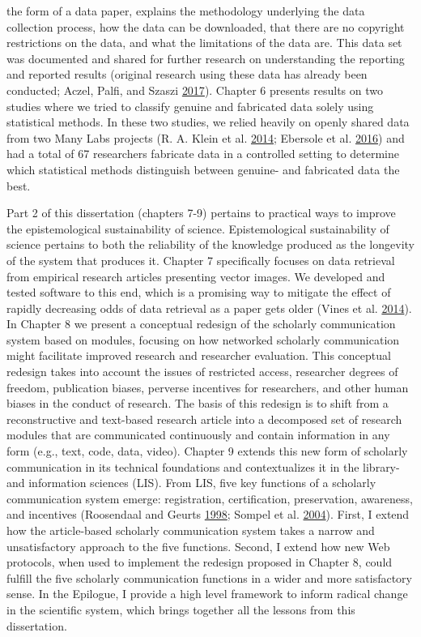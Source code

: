 \documentclass[a5paper]{book}
\begin{document}
the form of a data paper, explains the methodology underlying the data
collection process, how the data can be downloaded, that there are no
copyright restrictions on the data, and what the limitations of the data
are. This data set was documented and shared for further research on
understanding the reporting and reported results (original research
using these data has already been conducted; Aczel, Palfi, and Szaszi
\protect\hyperlink{ref-doi:10.1371ux2fjournal.pone.0182651}{2017}).
Chapter 6 presents results on two studies where we tried to classify
genuine and fabricated data solely using statistical methods. In these
two studies, we relied heavily on openly shared data from two Many Labs
projects (R. A. Klein et al.
\protect\hyperlink{ref-doi:10.1027ux2f1864-9335ux2fa000178}{2014};
Ebersole et al.
\protect\hyperlink{ref-doi:10.1016ux2fj.jesp.2015.10.012}{2016}) and had
a total of 67 researchers fabricate data in a controlled setting to
determine which statistical methods distinguish between genuine- and
fabricated data the best.

Part 2 of this dissertation (chapters 7-9) pertains to practical ways to
improve the epistemological sustainability of science. Epistemological
sustainability of science pertains to both the reliability of the
knowledge produced as the longevity of the system that produces it.
Chapter 7 specifically focuses on data retrieval from empirical research
articles presenting vector images. We developed and tested software to
this end, which is a promising way to mitigate the effect of rapidly
decreasing odds of data retrieval as a paper gets older (Vines et al.
\protect\hyperlink{ref-doi:10.1016ux2fj.cub.2013.11.014}{2014}). In
Chapter 8 we present a conceptual redesign of the scholarly
communication system based on modules, focusing on how networked
scholarly communication might facilitate improved research and
researcher evaluation. This conceptual redesign takes into account the
issues of restricted access, researcher degrees of freedom, publication
biases, perverse incentives for researchers, and other human biases in
the conduct of research. The basis of this redesign is to shift from a
reconstructive and text-based research article into a decomposed set of
research modules that are communicated continuously and contain
information in any form (e.g., text, code, data, video). Chapter 9
extends this new form of scholarly communication in its technical
foundations and contextualizes it in the library- and information
sciences (LIS). From LIS, five key functions of a scholarly
communication system emerge: registration, certification, preservation,
awareness, and incentives (Roosendaal and Geurts
\protect\hyperlink{ref-roosendaal1998}{1998}; Sompel et al.
\protect\hyperlink{ref-doi:10.1045ux2fseptember2004-vandesompel}{2004}).
First, I extend how the article-based scholarly communication system
takes a narrow and unsatisfactory approach to the five functions.
Second, I extend how new Web protocols, when used to implement the
redesign proposed in Chapter 8, could fulfill the five scholarly
communication functions in a wider and more satisfactory sense. In the
Epilogue, I provide a high level framework to inform radical change in
the scientific system, which brings together all the lessons from this
dissertation.
\end{document}
